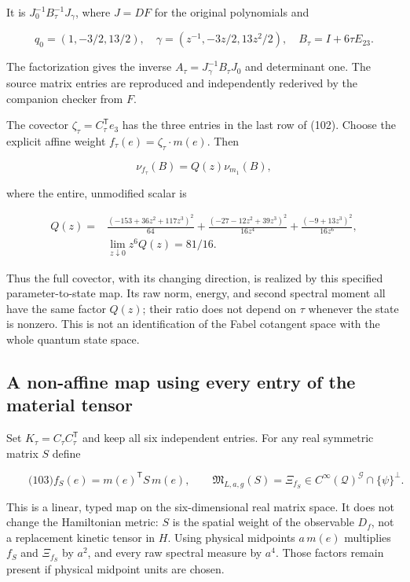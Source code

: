 It is \(J_0^{-1}B_\tau^{-1}J_\gamma\), where \(J=DF\) for the original
polynomials and

\[
q_0=(1,-3/2,13/2),\quad
\gamma=(z^{-1},-3z/2,13z^2/2),\quad B_\tau=I+6\tau E_{23}.
\]

The factorization gives the inverse \(A_\tau=J_\gamma^{-1}B_\tau J_0\)
and determinant one. The source matrix entries are reproduced and
independently rederived by the companion checker from \(F\).

The covector \(\zeta_\tau=C_\tau^{\mathsf T}e_3\) has the three entries
in the last row of (102). Choose the explicit affine weight
\(f_\tau(e)=\zeta_\tau\cdot m(e)\). Then

\[
\nu_{f_\tau}(B)=Q(z)\nu_{m_1}(B),
\]

where the entire, unmodified scalar is

\[
\begin{aligned}
 Q(z)={}&\frac{(-153+36z^2+117z^3)^2}{64}
 +\frac{(-27-12z^2+39z^3)^2}{16z^4}
 +\frac{(-9+13z^3)^2}{16z^6},\\
 &\lim_{z\downarrow0}z^6Q(z)=81/16 .
\end{aligned}
\]

Thus the full covector, with its changing direction, is realized by this
specified parameter-to-state map. Its raw norm, energy, and second
spectral moment all have the same factor \(Q(z)\); their ratio does not
depend on \(\tau\) whenever the state is nonzero. This is not an
identification of the Fabel cotangent space with the whole quantum state
space.

\subsection{A non-affine map using every entry of the material
tensor}\label{fabel-tensor-transfer-md-a-non-affine-map-using-every-entry-of-the-material-tensor}

Set \(K_\tau=C_\tau C_\tau^{\mathsf T}\) and keep all six independent
entries. For any real symmetric matrix \(S\) define

\[
\qquad\text{(103)}
 f_S(e)=m(e)^{\mathsf T}S\,m(e),\qquad
 \mathfrak M_{L,a,g}(S)=\Xi_{f_S}\in
 C^\infty(\mathcal Q)^{\mathcal G}\cap\{\psi\}^{\perp}.
\]

This is a linear, typed map on the six-dimensional real matrix space. It
does not change the Hamiltonian metric: \(S\) is the spatial weight of
the observable \(D_f\), not a replacement kinetic tensor in \(H\). Using
physical midpoints \(a\,m(e)\) multiplies \(f_S\) and \(\Xi_{f_S}\) by
\(a^2\), and every raw spectral measure by \(a^4\). Those factors remain
present if physical midpoint units are chosen.


